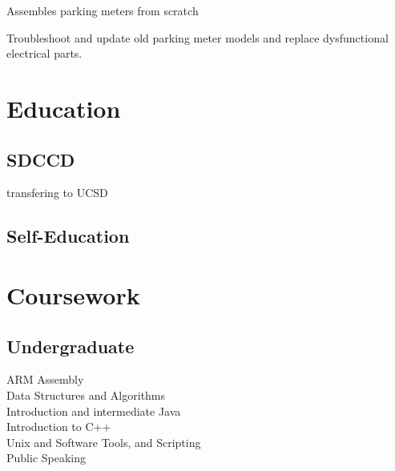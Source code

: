 \documentclass[]{deedy-resume-openfont}
\begin{document}
\begin{minipage}[t]{0.60\textwidth}
\vspace{\topsep} %
\begin{tightemize}
\item Assembles parking meters from scratch
\item Troubleshoot and update old parking meter models and replace dysfunctional electrical parts.
\end{tightemize}
\sectionsep

%
%

\end{minipage}
\hfill
\begin{minipage}[t]{0.33\textwidth}


\section{Education}
\subsection{SDCCD}
transfering to UCSD \\
\sectionsep

\subsection{Self-Education}
\sectionsep


\section{Coursework}
\subsection{Undergraduate}
ARM Assembly \\
Data Structures and Algorithms \\
Introduction and intermediate Java \\
Introduction to C++ \\
Unix and Software Tools, and Scripting \\
Public Speaking
\sectionsep


\end{minipage}
\end{document}
